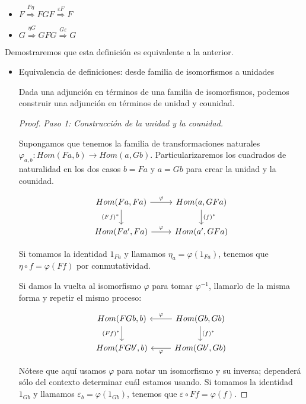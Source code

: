 \documentclass[11pt]{article}
\begin{document}
\begin{itemize}
\begin{definition}
\begin{itemize}
\item $F \overset{F \eta} \Longrightarrow FGF \overset{\varepsilon F}\Longrightarrow F$
\item $G \overset{\eta G} \Longrightarrow GFG \overset{G \varepsilon}\Longrightarrow G$
\end{itemize}
\end{definition}

Demostraremos que esta definición es equivalente a la anterior.

\begin{itemize}
\item Equivalencia de definiciones: desde familia de isomorfismos a unidades
\label{sec-7-5-1-3-1}
\begin{theorem}
Dada una adjunción en términos de una familia de isomorfismos, podemos
construir una adjunción en términos de unidad y counidad.
\end{theorem}

\begin{proof}
\emph{Paso 1: Construcción de la unidad y la counidad.}

Supongamos que tenemos la familia de transformaciones naturales
$\varphi_{a,b} : Hom(Fa,b) \to Hom(a,Gb)$. Particularizaremos los cuadrados de
naturalidad en los dos casos $b = Fa$ y $a = Gb$ para crear la unidad y
la counidad.

\[\begin{tikzcd}
Hom(Fa,Fa) \arrow{d}[swap]{(Ff)^\ast} \arrow{r}{\varphi} & 
Hom(a,GFa) \arrow{d}{(f)^\ast} \\
Hom(Fa', Fa) \arrow{r}{\varphi} &
Hom(a',GFa)
\end{tikzcd}\]

Si tomamos la identidad $1_{Fa}$ y llamamos $\eta_a = \varphi(1_{Fa})$, tenemos que
$\eta \circ f = \varphi(Ff)$ por conmutatividad.

Si damos la vuelta al isomorfismo $\varphi$ para tomar $\varphi^{-1}$, llamarlo de la
misma forma y repetir el mismo proceso:

\[\begin{tikzcd}
Hom(FGb,b) \arrow{d}[swap]{(Ff)^\ast} & 
Hom(Gb,Gb) \arrow{d}{(f)^\ast} \lar[swap]{\varphi} \\
Hom(FGb', b) &
Hom(Gb',Gb) \lar{\varphi}
\end{tikzcd}\]

Nótese que aquí usamos $\varphi$ para notar un isomorfismo y su inversa;
dependerá sólo del contexto determinar cuál estamos usando.
Si tomamos la identidad $1_{Gb}$ y llamamos $\varepsilon_b = \varphi(1_{Gb})$, tenemos que
$\varepsilon \circ Ff = \varphi(f)$.


\end{proof}
\end{itemize}
\end{itemize}
\end{document}
